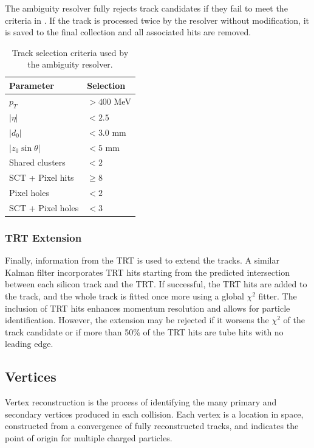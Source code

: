The ambiguity resolver fully rejects track candidates if they fail to meet the criteria in .
If the track is processed twice by the resolver without modification, it is saved to the final collection and all associated hits are removed.

\begin{table}[h!]
    \centering
    \begin{tabular}{ll}
        \toprule
        Parameter           & Selection   \\
        \midrule
        $p_T$               & $> 400$ MeV \\
        $|\eta|$            & $< 2.5$     \\
        $|d_0|$             & $< 3.0$ mm  \\
        $|z_0 \sin \theta|$ & $< 5$ mm    \\
        Shared clusters     & $< 2$       \\
        SCT + Pixel hits    & $\geq 8$    \\
        Pixel holes         & $< 2$       \\
        SCT + Pixel holes   & $< 3$       \\
        \bottomrule
    \end{tabular}
    \caption{Track selection criteria used by the ambiguity resolver.}
    \label{tab:track_criteria}
\end{table}

\subsubsection{TRT Extension}

Finally, information from the TRT is used to extend the tracks.
A similar Kalman filter incorporates TRT hits starting from the predicted intersection between each silicon track and the TRT.
If successful, the TRT hits are added to the track, and the whole track is fitted once more using a global $\chi^2$ fitter.
The inclusion of TRT hits enhances momentum resolution and allows for particle identification.
However, the extension may be rejected if it worsens the $\chi^2$ of the track candidate or if more than 50\% of the TRT hits are tube hits with no leading edge.

\subsection{Vertices}

Vertex reconstruction is the process of identifying the many primary and secondary vertices produced in each collision.
Each vertex is a location in space, constructed from a convergence of fully reconstructed tracks, and indicates the point of origin for multiple charged particles.

